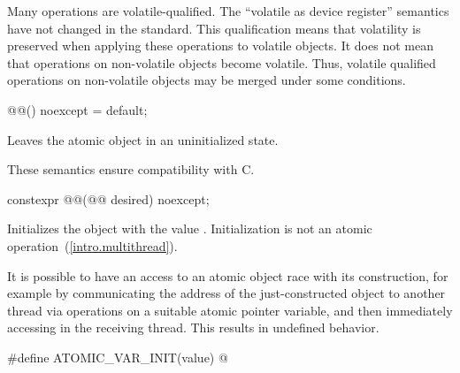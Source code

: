 \pnum
\begin{note} Many operations are volatile-qualified. The ``volatile as device register''
semantics have not changed in the standard. This qualification means that volatility is
preserved when applying these operations to volatile objects. It does not mean that
operations on non-volatile objects become volatile. Thus, volatile qualified operations
on non-volatile objects may be merged under some conditions. \end{note}

%
%
%
\begin{itemdecl}
@@() noexcept = default;
\end{itemdecl}

\begin{itemdescr}
\pnum
\effects
Leaves the atomic object in an uninitialized state.
\begin{note}
These semantics ensure compatibility with C.
\end{note}
\end{itemdescr}

%
%
%
\begin{itemdecl}
constexpr @@(@@ desired) noexcept;
\end{itemdecl}

\begin{itemdescr}
\pnum
\effects Initializes the object with the value .
Initialization is not an atomic operation~(\ref{intro.multithread}).
\begin{note} It is possible to have an access to an atomic object 
race with its construction, for example by communicating the address of the
just-constructed object  to another thread via
 operations on a suitable atomic pointer
variable, and then immediately accessing  in the receiving thread.
This results in undefined behavior. \end{note}
\end{itemdescr}

%
\begin{itemdecl}
#define ATOMIC_VAR_INIT(value) @\seebelow@
\end{itemdecl}

